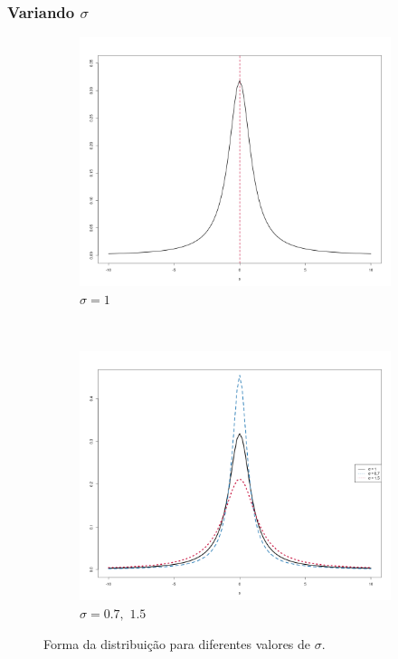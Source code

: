 \documentclass[13pt, aspectratio=169]{beamer}
\begin{document}
\begin{frame}
    

\end{frame}

\begin{frame}
    \frametitle{Variando $\sigma$}
    
    \begin{figure}[!ht]
        \centering
        \begin{subfigure}[t]{0.43\textwidth}
            \centering
            \includegraphics[width=\textwidth]{images/variando_sigma_1.png}
            \caption{$\sigma = 1$}
        \end{subfigure}%
        ~
        \begin{subfigure}[t]{0.43\textwidth}
            \centering
            \includegraphics[width=\textwidth]{images/variando_sigma_2.png}
            \caption{$\sigma = 0.7, \,\, 1.5$}
        \end{subfigure}%
        \caption{Forma da distribuição para diferentes valores de $\sigma$.}
    \end{figure} 

\end{frame}
\end{document}
